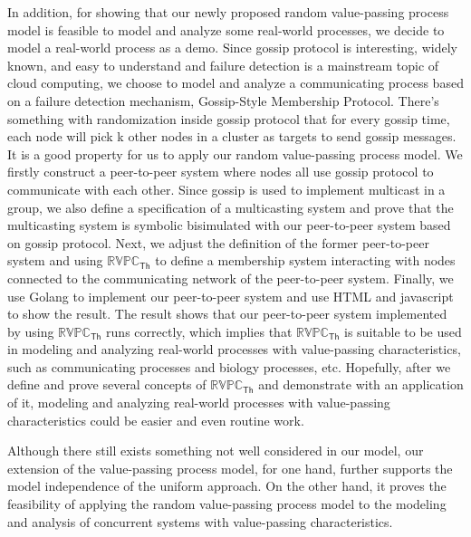 \begin{digest}
   In addition, for showing that our newly proposed random value-passing process model is feasible to model and analyze some real-world processes, we decide to model a real-world process as a demo. Since gossip protocol is interesting, widely known, and easy to understand and failure detection is a mainstream topic of cloud computing, we choose to model and analyze a communicating process based on a failure detection mechanism, Gossip-Style Membership Protocol. There's something with randomization inside gossip protocol that for every gossip time, each node will pick k other nodes in a cluster as targets to send gossip messages. It is a good property for us to apply our random value-passing process model. We firstly construct a peer-to-peer system where nodes all use gossip protocol to communicate with each other. Since gossip is used to implement multicast in a group, we also define a specification of a multicasting system and prove that the multicasting system is symbolic bisimulated with our peer-to-peer system based on gossip protocol. Next, we adjust the definition of the former peer-to-peer system and using $\mathbb{RVPC}_{\mathsf{Th}}$ to define a membership system interacting with nodes connected to the communicating network of the peer-to-peer system. Finally, we use Golang to implement our peer-to-peer system and use HTML and javascript to show the result. The result shows that our peer-to-peer system implemented by using $\mathbb{RVPC}_{\mathsf{Th}}$ runs correctly, which implies that $\mathbb{RVPC}_{\mathsf{Th}}$ is suitable to be used in modeling and analyzing real-world processes with value-passing characteristics, such as communicating processes and biology processes, etc. Hopefully, after we define and prove several concepts of $\mathbb{RVPC}_{\mathsf{Th}}$ and demonstrate with an application of it, modeling and analyzing real-world processes with value-passing characteristics could be easier and even routine work.

  Although there still exists something not well considered in our model, our extension of the value-passing process model, for one hand, further supports the model independence of the uniform approach. On the other hand, it proves the feasibility of applying the random value-passing process model to the modeling and analysis of concurrent systems with value-passing characteristics.
\end{digest}
